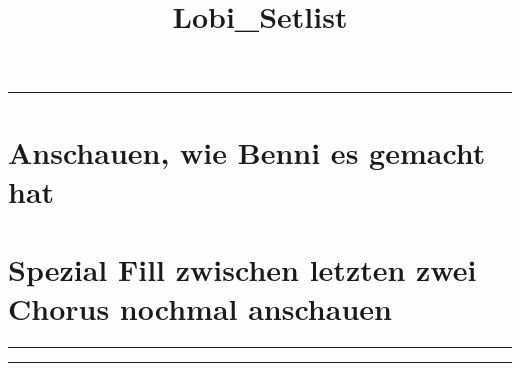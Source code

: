 \documentclass[12pt,a4paper,oneside,final,ngerman]{scrartcl}
\title{Lobi\_Setlist}
\begin{document}
\pagestyle{myheadings}





\hrule
\vspace{1cm}


\section*{Anschauen, wie Benni es gemacht hat}

\section*{Spezial Fill zwischen letzten zwei Chorus nochmal anschauen}



\hrule
\vspace{1cm}

% 

\hrule
\end{document}
